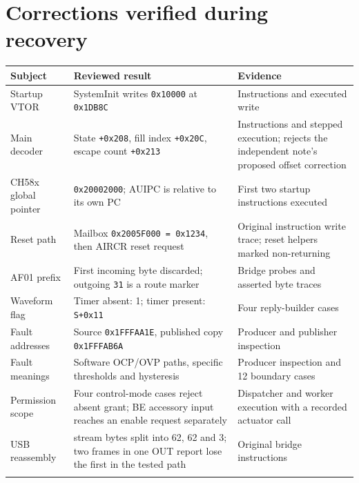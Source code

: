 \section{Corrections verified during
recovery}\label{corrections-verified-during-recovery}

{\def\LTcaptype{none} %
\begin{longtable}[]{@{}
  >{\raggedright\arraybackslash}p{}
  >{\raggedright\arraybackslash}p{}
  >{\raggedright\arraybackslash}p{}@{}}
\toprule\noalign{}
\begin{minipage}[b]{\linewidth}\raggedright
Subject
\end{minipage} & \begin{minipage}[b]{\linewidth}\raggedright
Reviewed result
\end{minipage} & \begin{minipage}[b]{\linewidth}\raggedright
Evidence
\end{minipage} \\
\midrule\noalign{}
\endhead
\bottomrule\noalign{}
\endlastfoot
Startup VTOR & SystemInit writes \texttt{0x10000} at \texttt{0x1DB8C} &
Instructions and executed write \\
Main decoder & State \texttt{+0x208}, fill index \texttt{+0x20C}, escape
count \texttt{+0x213} & Instructions and stepped execution; rejects the
independent note's proposed offset correction \\
CH58x global pointer & \texttt{0x20002000}; AUIPC is relative to its own
PC & First two startup instructions executed \\
Reset path & Mailbox \texttt{0x2005F000\ =\ 0x1234}, then AIRCR reset
request & Original instruction write trace; reset helpers marked
non-returning \\
AF01 prefix & First incoming byte discarded; outgoing \texttt{31} is a
route marker & Bridge probes and asserted byte traces \\
Waveform flag & Timer absent: 1; timer present: \texttt{S+0x11} & Four
reply-builder cases \\
Fault addresses & Source \texttt{0x1FFFAA1E}, published copy
\texttt{0x1FFFAB6A} & Producer and publisher inspection \\
Fault meanings & Software OCP/OVP paths, specific thresholds and
hysteresis & Producer inspection and 12 boundary cases \\
Permission scope & Four control-mode cases reject absent grant; BE
accessory input reaches an enable request separately & Dispatcher and
worker execution with a recorded actuator call \\
USB reassembly & 127 stream bytes split into 62, 62 and 3; two frames in
one OUT report lose the first in the tested path & Original bridge
instructions \\*
\end{longtable}
}

